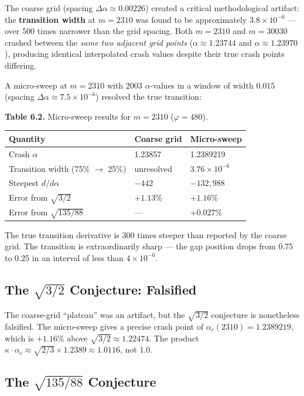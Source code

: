 \documentclass[11pt,letterpaper]{article}
\theoremstyle{definition}
\theoremstyle{remark}
\begin{document}
The coarse grid (spacing $\Delta\alpha \approx 0.00226$) created a critical methodological artifact: the \textbf{transition width} at $m = 2310$ was found to be approximately $3.8 \times 10^{-6}$ --- over 500 times narrower than the grid spacing. Both $m = 2310$ and $m = 30030$ crashed between the \emph{same two adjacent grid points} ($\alpha \approx 1.23744$ and $\alpha \approx 1.23970$), producing identical interpolated crash values despite their true crash points differing.

A micro-sweep at $m = 2310$ with 2003 $\alpha$-values in a window of width $0.015$ (spacing $\Delta\alpha \approx 7.5 \times 10^{-6}$) resolved the true transition:

\textbf{Table 6.2.} Micro-sweep results for $m = 2310$ ($\varphi = 480$).

\begin{longtable}[]{@{}lll@{}}
\toprule
Quantity & Coarse grid & Micro-sweep \\
\midrule
\endhead
\bottomrule
Crash $\alpha$ & 1.23857 & 1.2389219 \\
Transition width (75\% $\to$ 25\%) & unresolved & $3.76 \times 10^{-6}$ \\
Steepest $d/d\alpha$ & $-442$ & $-132{,}988$ \\
Error from $\sqrt{3/2}$ & $+1.13\%$ & $+1.16\%$ \\
Error from $\sqrt{135/88}$ & --- & $+0.027\%$ \\
\end{longtable}

The true transition derivative is 300 times steeper than reported by the coarse grid. The transition is extraordinarily sharp --- the gap position drops from 0.75 to 0.25 in an interval of less than $4 \times 10^{-6}$.

\subsection{The $\sqrt{3/2}$ Conjecture: Falsified}\label{the-sqrt32-conjecture-falsified}

The coarse-grid ``plateau'' was an artifact, but the $\sqrt{3/2}$ conjecture is nonetheless falsified. The micro-sweep gives a precise crash point of $\alpha_c(2310) = 1.2389219$, which is $+1.16\%$ above $\sqrt{3/2} \approx 1.22474$. The product $\kappa \cdot \alpha_c \approx \sqrt{2/3} \times 1.2389 \approx 1.0116$, not $1.0$.

\subsection{The $\sqrt{135/88}$ Conjecture}\label{the-sqrt13588-conjecture}
\end{document}
